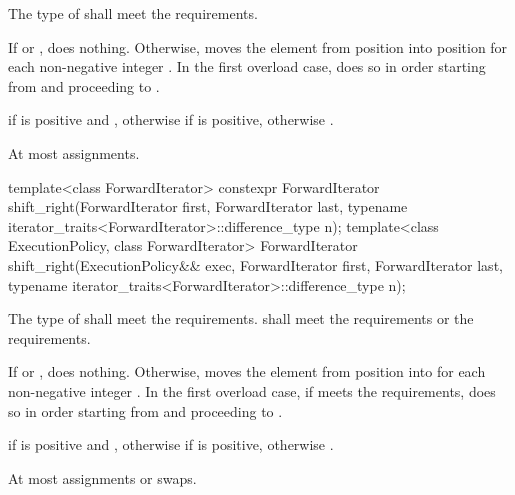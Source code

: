 \begin{itemdescr}
\pnum
\requires
The type of  shall meet
the  requirements.

\pnum
\effects
If  or , does nothing.
Otherwise, moves the element
from position 
into position 
for each non-negative integer .
In the first overload case, does so in order starting
from  and proceeding to .

\pnum
\returns
{}
if  is positive and ,
otherwise  if  is positive, otherwise .

\pnum
\complexity
At most  assignments.
\end{itemdescr}

%
\begin{itemdecl}
template<class ForwardIterator>
  constexpr ForwardIterator
    shift_right(ForwardIterator first, ForwardIterator last,
                typename iterator_traits<ForwardIterator>::difference_type n);
template<class ExecutionPolicy, class ForwardIterator>
  ForwardIterator
    shift_right(ExecutionPolicy&& exec, ForwardIterator first, ForwardIterator last,
                typename iterator_traits<ForwardIterator>::difference_type n);
\end{itemdecl}

\begin{itemdescr}
\pnum
\requires
The type of  shall meet
the  requirements.
 shall meet
the  requirements or
the  requirements.

\pnum
\effects
If  or , does nothing.
Otherwise, moves the element
from position  into 
for each non-negative integer .
In the first overload case, if  meets
the  requirements,
does so in order starting
from  and proceeding to .

\pnum
\returns
{}
if  is positive and ,
otherwise  if  is positive, otherwise .

\pnum
\complexity
At most  assignments or swaps.
\end{itemdescr}

